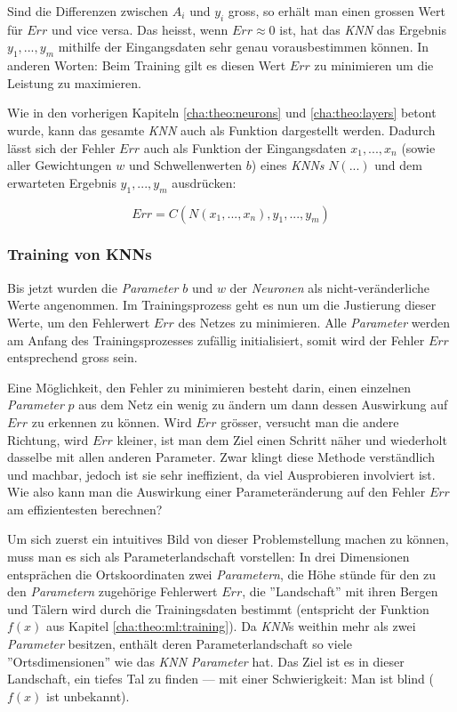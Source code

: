 Sind die Differenzen zwischen $A_i$ und $y_i$ gross, so erhält man einen grossen Wert für $Err$ und vice versa. Das heisst, wenn $Err \approx 0$ ist, hat das \textit{KNN} das Ergebnis $y_1,...,y_m$ mithilfe der Eingangsdaten sehr genau vorausbestimmen können. In anderen Worten: Beim Training gilt es diesen Wert $Err$ zu minimieren um die Leistung zu maximieren.

Wie in den vorherigen Kapiteln \ref{cha:theo:neurons} und \ref{cha:theo:layers} betont wurde, kann das gesamte \textit{KNN} auch als Funktion dargestellt werden. Dadurch lässt sich der Fehler $Err$ auch als Funktion der Eingangsdaten $x_1,...,x_n$ (sowie aller Gewichtungen $w$ und Schwellenwerten $b$) eines \textit{KNNs} $N(...)$ und dem erwarteten Ergebnis $y_1,...,y_m$  ausdrücken:

\begin{equation}\label{eq:err_func}
Err = C(N(x_1,...,x_n), y_1,...,y_m)
\end{equation}

\subsubsection{Training von KNNs}\label{cha:theo:backprop}
Bis jetzt wurden die \textit{Parameter} $b$ und $w$ der \textit{Neuronen} als nicht-veränderliche Werte angenommen. Im Trainingsprozess geht es nun um die Justierung dieser Werte, um den Fehlerwert $Err$ des Netzes zu minimieren. Alle \textit{Parameter} werden am Anfang des Trainingsprozesses zufällig initialisiert, somit wird der Fehler $Err$ entsprechend gross sein.

Eine Möglichkeit, den Fehler zu minimieren besteht darin, einen einzelnen \textit{Parameter} $p$ aus dem Netz ein wenig zu ändern um dann dessen Auswirkung auf $Err$ zu erkennen zu können. Wird $Err$ grösser, versucht man die andere Richtung, wird $Err$ kleiner, ist man dem Ziel einen Schritt näher und wiederholt dasselbe mit allen anderen Parameter. Zwar klingt diese Methode verständlich und machbar, jedoch ist sie sehr ineffizient, da viel Ausprobieren involviert ist. Wie also kann man die Auswirkung einer Parameteränderung auf den Fehler $Err$ am effizientesten berechnen?

Um sich zuerst ein intuitives Bild von dieser Problemstellung machen zu können, muss man es sich als Parameterlandschaft vorstellen: In drei Dimensionen entsprächen die Ortskoordinaten zwei \textit{Parametern}, die Höhe stünde für den zu den \textit{Parametern} zugehörige Fehlerwert $Err$, die ''Landschaft'' mit ihren Bergen und Tälern wird durch die Trainingsdaten bestimmt (entspricht der Funktion $f(x)$ aus Kapitel \ref{cha:theo:ml:training}). Da \textit{KNN}s weithin mehr als zwei \textit{Parameter} besitzen, enthält deren Parameterlandschaft so viele ''Ortsdimensionen'' wie das \textit{KNN} \textit{Parameter} hat. Das Ziel ist es in dieser Landschaft, ein tiefes Tal zu finden --- mit einer Schwierigkeit: Man ist blind ($f(x)$ ist unbekannt).

